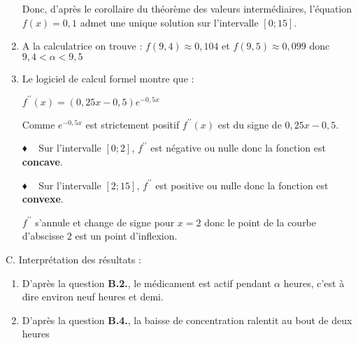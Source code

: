 \begin{corrige}
\begin{enumerate}
          \par
          Donc, d'après le corollaire du théorème des valeurs intermédiaires, l'équation $f\left(x\right)=0,1$ admet une unique solution sur l'intervalle $\left[0; 15\right]$.
          \item
          A la calculatrice on trouve : $f\left(9,4\right)\approx 0,104$ et $f\left(9,5\right)\approx 0,099$ donc $9,4 < \alpha  < 9,5$
          \item
          Le logiciel de calcul formel montre que :
          \par
          $f^{\prime\prime}\left(x\right) = \left(0,25x-0,5\right) e^{-0,5x}$
          \par
          Comme $e^{- 0,5x}$ est strictement positif $f^{\prime\prime}\left(x\right)$ est du signe de $0,25x-0,5$.
          \par
          ♦ ~ Sur l'intervalle $\left[0; 2\right]$, $f^{\prime\prime}$ est négative ou nulle donc la fonction est \textbf{concave}.
          \par
          ♦ ~ Sur l'intervalle $\left[2; 15\right]$, $f^{\prime\prime}$ est positive ou nulle donc la fonction est \textbf{convexe}.
          \par
          $f^{\prime\prime}$ s'annule et change de signe pour $x=2$ donc le point de la courbe d'abscisse $2$ est un point d'inflexion.
     \end{enumerate}
     \begin{h3}C. Interprétation des résultats :\end{h3}
     \begin{enumerate}
          \item
          D'après la question \textbf{B.2.}, le médicament est actif pendant $\alpha $ heures, c'est à dire environ neuf heures et demi.
          \item
          D'après la question \textbf{B.4.}, la baisse de concentration ralentit au bout de deux heures
     \end{enumerate}
\end{corrige}
